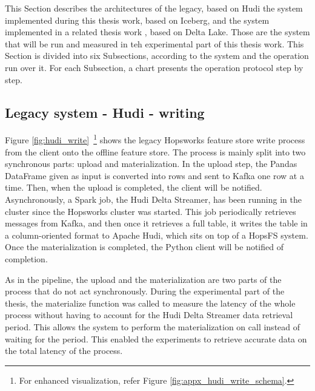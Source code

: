 This Section describes the architectures of the legacy, based on Hudi the system implemented during this thesis work, based on Iceberg, and the system implemented in a related thesis work \cite{manfrediReducingReadWrite2024}, based on Delta Lake. Those are the system that will be run and measured in teh experimental part of this thesis work. This Section is divided into six Subsections, according to the system and the operation run over it. For each Subsection, a chart presents the operation protocol step by step.



\subsection{Legacy system - Hudi - writing}
\label{subsec:back_sys_hudi_write}

Figure \ref{fig:hudi_write}~\footnote{For enhanced visualization, refer Figure \ref{fig:appx_hudi_write_schema}.} shows the legacy Hopsworks feature store write process from the client onto the offline feature store. The process is mainly split into two synchronous parts: upload and materialization. In the upload step, the Pandas DataFrame given as input is converted into rows and sent to Kafka one row at a time. Then, when the upload is completed, the client will be notified. Asynchronously, a Spark job, the Hudi Delta Streamer, has been running in the cluster since the Hopsworks cluster was started. This job periodically retrieves messages from Kafka, and then once it retrieves a full table, it writes the table in a column-oriented format to Apache Hudi, which sits on top of a \gls{HopsFS} system. Once the materialization is completed, the Python client will be notified of completion.

As in the pipeline, the upload and the materialization are two parts of the process that do not act synchronously. During the experimental part of the thesis, the materialize function was called to measure the latency of the whole process without having to account for the Hudi Delta Streamer data retrieval period. This allows the system to perform the materialization on call instead of waiting for the period. This enabled the experiments to retrieve accurate data on the total latency of the process.

